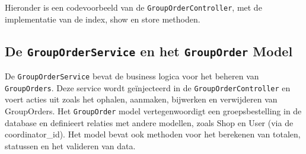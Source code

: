 Hieronder is een codevoorbeeld van de \texttt{GroupOrderController}, met de implementatie van de index, show en store methoden.

\subsection{De \texttt{GroupOrderService} en het \texttt{GroupOrder} Model}

De \texttt{GroupOrderService} bevat de business logica voor het beheren van \texttt{GroupOrders}. Deze service wordt geïnjecteerd in de \texttt{GroupOrderController} en voert acties uit zoals het ophalen, aanmaken, bijwerken en verwijderen van GroupOrders. Het \texttt{GroupOrder} model vertegenwoordigt een groepsbestelling in de database en definieert relaties met andere modellen, zoals Shop en User (via de coordinator\_id). Het model bevat ook methoden voor het berekenen van totalen, statussen en het valideren van data.

